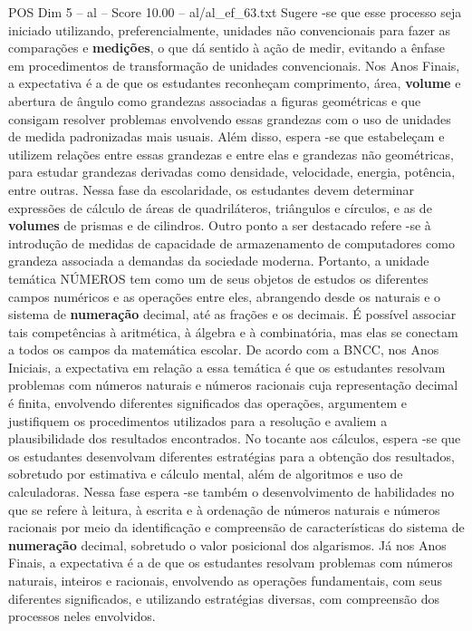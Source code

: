 \begin{textsample}{POS Dim 5 – al – Score 10.00 – al/al\_ef\_63.txt}
Sugere -se que esse processo seja iniciado utilizando, preferencialmente, unidades não convencionais para fazer as comparações e \textbf{medições}, o que dá sentido à ação de medir, evitando a ênfase em procedimentos de transformação de unidades convencionais.
Nos Anos Finais, a expectativa é a de que os estudantes reconheçam comprimento, área, \textbf{volume} e abertura de ângulo como grandezas associadas a figuras geométricas e que consigam resolver problemas envolvendo essas grandezas com o uso de unidades de medida padronizadas mais usuais.
Além disso, espera -se que estabeleçam e utilizem relações entre essas grandezas e entre elas e grandezas não geométricas, para estudar grandezas derivadas como densidade, velocidade, energia, potência, entre outras.
Nessa fase da escolaridade, os estudantes devem determinar expressões de cálculo de áreas de quadriláteros, triângulos e círculos, e as de \textbf{volumes} de prismas e de cilindros.
Outro ponto a ser destacado refere -se à introdução de medidas de capacidade de armazenamento de computadores como grandeza associada a demandas da sociedade moderna.
Portanto, a unidade temática NÚMEROS tem como um de seus objetos de estudos os diferentes campos numéricos e as operações entre eles, abrangendo desde os naturais e o sistema de \textbf{numeração} decimal, até as frações e os decimais.
É possível associar tais competências à aritmética, à álgebra e à combinatória, mas elas se conectam a todos os campos da matemática escolar.
De acordo com a BNCC, nos Anos Iniciais, a expectativa em relação a essa temática é que os estudantes resolvam problemas com números naturais e números racionais cuja representação decimal é finita, envolvendo diferentes significados das operações, argumentem e justifiquem os procedimentos utilizados para a resolução e avaliem a plausibilidade dos resultados encontrados.
No tocante aos cálculos, espera -se que os estudantes desenvolvam diferentes estratégias para a obtenção dos resultados, sobretudo por estimativa e cálculo mental, além de algoritmos e uso de calculadoras.
Nessa fase espera -se também o desenvolvimento de habilidades no que se refere à leitura, à escrita e à ordenação de números naturais e números racionais por meio da identificação e compreensão de características do sistema de \textbf{numeração} decimal, sobretudo o valor posicional dos algarismos.
Já nos Anos Finais, a expectativa é a de que os estudantes resolvam problemas com números naturais, inteiros e racionais, envolvendo as operações fundamentais, com seus diferentes significados, e utilizando estratégias diversas, com compreensão dos processos neles envolvidos.

\end{textsample}
